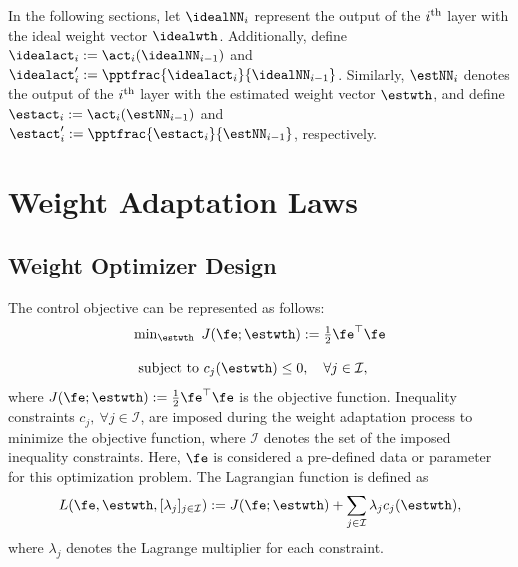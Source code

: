 \documentclass[lettersize,journal]{IEEEtran}
\begin{document}
In the following sections, let $\idealNN_i$ represent the output of the $i\textsuperscript{th}$ layer with the ideal weight vector $\idealwth$. 
Additionally, define $\idealact_i:=\act_i(\idealNN_{i-1})$ and ${\idealact}'_i:= \pptfrac{\idealact_i}{\idealNN_{i-1}}$. 
Similarly, $\estNN_i$ denotes the output of the $i\textsuperscript{th}$ layer with the estimated weight vector $\estwth$, and define $\estact_i:=\act_i(\estNN_{i-1})$ and $\estact_i':= \pptfrac{\estact_i}{\estNN_{i-1}}$, respectively.

\section{Weight Adaptation Laws}\label{sec:adap_laws}

\subsection{Weight Optimizer Design}\label{sec:sub:weight optimizer}

The control objective can be represented as follows:
\begin{equation}
    \begin{matrix}
        \min_{\estwth} \ J(\fe;\estwth):= 
        \tfrac{1}{2} \fe^\top \fe
        \\ \\
        \begin{aligned}
        \text{subject to }&c_{j}(\estwth) 
        \le0, \quad \forall j\in\mathcal{I},
        \end{aligned}
    \end{matrix}
    \label{eq:opt:problem1}
\end{equation}
where $J(\fe;\estwth):= \tfrac{1}{2} \fe^\top \fe$ is the objective function.
Inequality constraints $c_j,\ \forall j\in\mathcal{I}$, are imposed during the weight adaptation process to minimize the objective function, where $\mathcal I$ denotes the set of the imposed inequality constraints. 
Here, $\fe$ is considered a pre-defined data or parameter for this optimization problem. The Lagrangian function is defined as
\begin{equation}
    L(
        \fe,\estwth,[\lambda_j]_{j\in\mathcal I}
    ) 
    := 
    J(\fe;\estwth) 
    + 
    \sum_{j\in\mathcal I}
    \lambda_{j}
    c_{j}(\estwth)
    ,
    \label{eq:lagrangian}
\end{equation}
where $\lambda_j$ denotes the Lagrange multiplier for each constraint.
\end{document}
